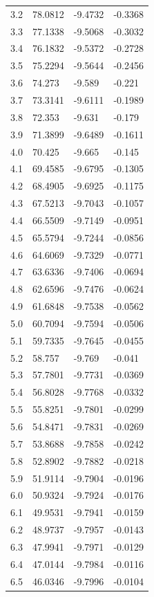 \begin{tabular}{llll}
3.2 & 78.0812 & -9.4732 & -0.3368 \\
3.3 & 77.1338 & -9.5068 & -0.3032 \\
3.4 & 76.1832 & -9.5372 & -0.2728 \\
3.5 & 75.2294 & -9.5644 & -0.2456 \\
3.6 & 74.273 & -9.589 & -0.221 \\
3.7 & 73.3141 & -9.6111 & -0.1989 \\
3.8 & 72.353 & -9.631 & -0.179 \\
3.9 & 71.3899 & -9.6489 & -0.1611 \\
4.0 & 70.425 & -9.665 & -0.145 \\
4.1 & 69.4585 & -9.6795 & -0.1305 \\
4.2 & 68.4905 & -9.6925 & -0.1175 \\
4.3 & 67.5213 & -9.7043 & -0.1057 \\
4.4 & 66.5509 & -9.7149 & -0.0951 \\
4.5 & 65.5794 & -9.7244 & -0.0856 \\
4.6 & 64.6069 & -9.7329 & -0.0771 \\
4.7 & 63.6336 & -9.7406 & -0.0694 \\
4.8 & 62.6596 & -9.7476 & -0.0624 \\
4.9 & 61.6848 & -9.7538 & -0.0562 \\
5.0 & 60.7094 & -9.7594 & -0.0506 \\
5.1 & 59.7335 & -9.7645 & -0.0455 \\
5.2 & 58.757 & -9.769 & -0.041 \\
5.3 & 57.7801 & -9.7731 & -0.0369 \\
5.4 & 56.8028 & -9.7768 & -0.0332 \\
5.5 & 55.8251 & -9.7801 & -0.0299 \\
5.6 & 54.8471 & -9.7831 & -0.0269 \\
5.7 & 53.8688 & -9.7858 & -0.0242 \\
5.8 & 52.8902 & -9.7882 & -0.0218 \\
5.9 & 51.9114 & -9.7904 & -0.0196 \\
6.0 & 50.9324 & -9.7924 & -0.0176 \\
6.1 & 49.9531 & -9.7941 & -0.0159 \\
6.2 & 48.9737 & -9.7957 & -0.0143 \\
6.3 & 47.9941 & -9.7971 & -0.0129 \\
6.4 & 47.0144 & -9.7984 & -0.0116 \\
6.5 & 46.0346 & -9.7996 & -0.0104 \\

\end{tabular}
